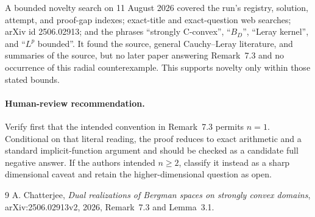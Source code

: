 \documentclass[11pt]{article}
\begin{document}
A bounded novelty search on 11 August 2026 covered the run's registry,
solution, attempt, and proof-gap indexes; exact-title and exact-question web
searches; arXiv id 2506.02913; and the phrases ``strongly C-convex'',
``$B_D$'', ``Leray kernel'', and ``$L^p$ bounded''.  It found the source,
general Cauchy--Leray literature, and summaries of the source, but no later
paper answering Remark~7.3 and no occurrence of this radial counterexample.
This supports novelty only within those stated bounds.

\paragraph{Human-review recommendation.}
Verify first that the intended convention in Remark~7.3 permits $n=1$.
Conditional on that literal reading, the proof reduces to exact arithmetic
and a standard implicit-function argument and should be checked as a
candidate full negative answer.  If the authors intended $n\ge2$, classify
it instead as a sharp dimensional caveat and retain the higher-dimensional
question as open.

\begin{thebibliography}{9}
A. Chatterjee,
\emph{Dual realizations of Bergman spaces on strongly convex domains},
arXiv:2506.02913v2, 2026, Remark~7.3 and Lemma~3.1.
\end{thebibliography}
\end{document}
